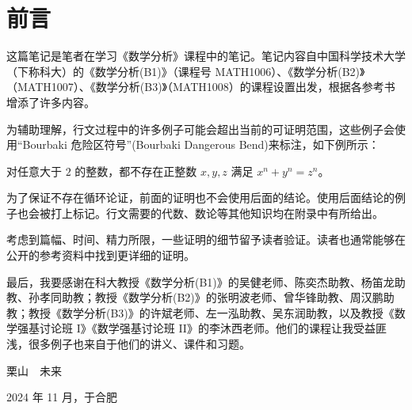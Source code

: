 \chapter*{前言}

这篇笔记是笔者在学习《数学分析》课程中的笔记。笔记内容自中国科学技术大学（下称科大）的《数学分析(B1)》（课程号 MATH1006）、《数学分析(B2)》（MATH1007）、《数学分析(B3)》（MATH1008）的课程设置出发，根据各参考书增添了许多内容。
  
为辅助理解，行文过程中的许多例子可能会超出当前的可证明范围，这些例子会使用“Bourbaki\footnotemark{} 危险区符号”(Bourbaki Dangerous Bend)\footnotemark{}来标注，如下例所示：



\begin{dtheorem*}
  对任意大于 \(2\) 的整数，都不存在正整数 \(x,y,z\) 满足 \(x^n+y^n=z^n\)。
\end{dtheorem*}


为了保证不存在循环论证，前面的证明也不会使用后面的结论。使用后面结论的例子也会被打上标记。行文需要的代数、数论等其他知识均在附录中有所给出。


考虑到篇幅、时间、精力所限，一些证明的细节留予读者验证。读者也通常能够在公开的参考资料中找到更详细的证明。

最后，我要感谢在科大教授《数学分析(B1)》的吴健老师、陈奕杰助教、杨笛龙助教、孙孝同助教；教授《数学分析(B2)》的张明波老师、曾华锋助教、周汉鹏助教；教授《数学分析(B3)》的许斌老师、左一泓助教、吴东润助教，以及教授《数学强基讨论班 I》《数学强基讨论班 II》的李沐西老师。\footnotemark{}他们的课程让我受益匪浅，很多例子也来自于他们的讲义、课件和习题。


\begin{flushright}
  栗山　未来\footnotemark

  2024 年 11 月，于合肥
\end{flushright}

